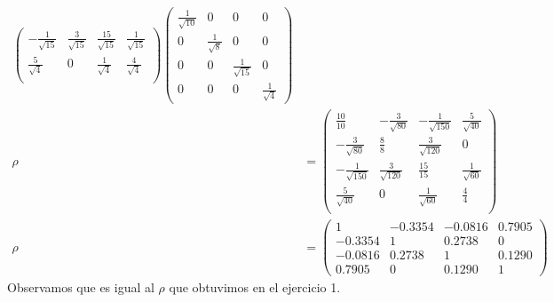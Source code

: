 \begin{sol}
\begin{align*}
\begin{pmatrix}
-\frac{1}{\sqrt{15}} & \frac{3}{\sqrt{15}} & \frac{15}{\sqrt{15}} & \frac{1}{\sqrt{15}} \\
\frac{5}{\sqrt{4}} & 0 & \frac{1}{\sqrt{4}} & \frac{4}{\sqrt{4}} \\
\end{pmatrix}
\begin{pmatrix}
\frac{1}{\sqrt{10}} & 0 & 0 & 0\\
0 &\frac{1}{\sqrt{8}}  & 0 & 0\\
0 & 0 & \frac{1}{\sqrt{15}}  & 0\\
0 &0 &0 & \frac{1}{\sqrt{4}} 
\end{pmatrix} \\
\rho &= 
\begin{pmatrix}
\frac{10}{10} & -\frac{3}{\sqrt{80}}& -\frac{1}{\sqrt{150}}& \frac{5}{\sqrt{40}} \\
-\frac{3}{\sqrt{80}} & \frac{8}{8}& \frac{3}{\sqrt{120}}& 0\\
-\frac{1}{\sqrt{150}} & \frac{3}{\sqrt{120}}& \frac{15}{15}& \frac{1}{\sqrt{60}}\\
\frac{5}{\sqrt{40}} & 0& \frac{1}{\sqrt{60}}& \frac{4}{4}\\
\end{pmatrix} \\
\rho &=
\begin{pmatrix}
1 & -0.3354 & -0.0816 & 0.7905 \\ 
-0.3354 & 1 & 0.2738 & 0 \\ 
-0.0816 & 0.2738 & 1 & 0.1290 \\
0.7905 & 0 & 0.1290 & 1
\end{pmatrix} 
\end{align*}
Observamos que es igual al $\rho$ que obtuvimos en el ejercicio 1.\\\\
\end{sol}